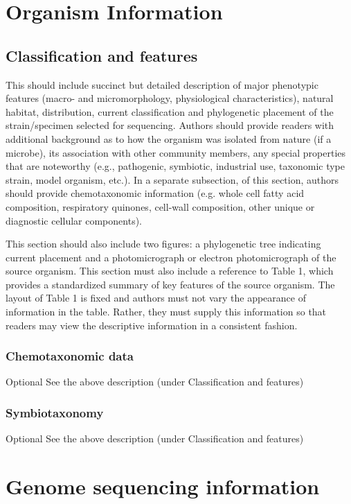 \documentclass{bmcart}
\begin{document}
{%
\section*{Organism Information}


\subsection*{Classification and features}
This should include succinct but detailed description of major phenotypic features (macro- and micromorphology, physiological characteristics), natural habitat, distribution, current classification and phylogenetic placement of the strain/specimen selected for sequencing. Authors should provide readers with additional background as to how the organism was isolated from nature (if a microbe), its association with other community members, any special properties that are noteworthy (e.g., pathogenic, symbiotic, industrial use, taxonomic type strain, model organism, etc.). In a separate subsection, of this section, authors should provide chemotaxonomic information (e.g. whole cell fatty acid composition, respiratory quinones, cell-wall composition, other unique or diagnostic cellular components).

This section should also include two figures: a phylogenetic tree indicating current placement and a photomicrograph or electron photomicrograph of the source organism. This section must also include a reference to Table 1, which provides a standardized summary of key features of the source organism. The layout of Table 1 is fixed and authors must not vary the appearance of information in the table. Rather, they must supply this information so that readers may view the descriptive information in a consistent fashion.

\subsubsection*{Chemotaxonomic data}
Optional
See the above description (under Classification and features)

\subsubsection*{Symbiotaxonomy}
Optional
See the above description (under Classification and features)


\section*{Genome sequencing information}

}
\end{document}
